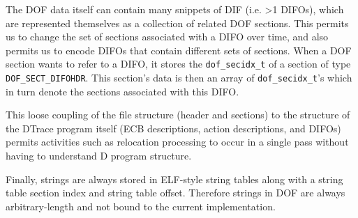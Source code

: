 The DOF data itself can contain many snippets of DIF (i.e. >1 DIFOs),
which are represented themselves as a collection of related DOF
sections.  This permits us to change the set of sections associated
with a DIFO over time, and also permits us to encode DIFOs that
contain different sets of sections.  When a DOF section wants to refer
to a DIFO, it stores the \verb|dof_secidx_t| of a section of type
\verb|DOF_SECT_DIFOHDR|.  This section's data is then an array of
\verb|dof_secidx_t|'s which in turn denote the sections associated
with this DIFO.

This loose coupling of the file structure (header and sections) to the
structure of the DTrace program itself (ECB descriptions, action
descriptions, and DIFOs) permits activities such as relocation
processing to occur in a single pass without having to understand D
program structure.

Finally, strings are always stored in ELF-style string tables along
with a string table section index and string table offset.  Therefore
strings in DOF are always arbitrary-length and not bound to the
current implementation.

